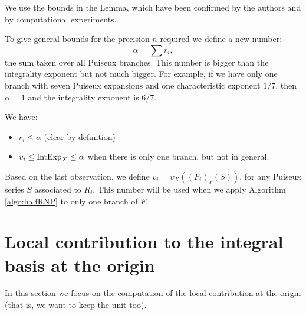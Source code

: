 \documentclass[a4paper,11pt,reqno]{amsart}%
\theoremstyle{definition}
\theoremstyle{plain}
\theoremstyle{remark}
\newcommand\ct[1]{\text{\rmfamily\upshape #1}}
\newcommand{\IntExpX}{\ct{IntExp}_X}
\begin{document}
We use the bounds in the Lemma, which have been confirmed by the authors and by computational experiments.

To give general bounds for the precision $n$ required we define a new number:
$$
\alpha = \sum r_i,
$$
the sum taken over all Puiseux branches. This number is bigger than the integrality exponent but not much bigger.
For example, if we have only one branch with seven Puiseux expansions and one characteristic exponent $1/7$, then $\alpha = 1$ and the integrality exponent is $6/7$.

We have:
\begin{itemize}
\item $r_i \le \alpha$ (clear by definition)
\item $v_i \le \IntExpX \le \alpha$ when there is only one branch, but not in general.
\end{itemize}

Based on the last observation, we define $\tilde v_i = \upsilon_X((F_i)_Y(S))$, for any Puiseux series \( S \) associated to \( R_i \). This number will be used when we apply Algorithm \ref{algo:halfRNP} to only one branch of $F$.

\section{Local contribution to the integral basis at the origin}

In this section we focus on the computation of the local contribution at the origin (that is, we want to keep the unit too).
\end{document}
